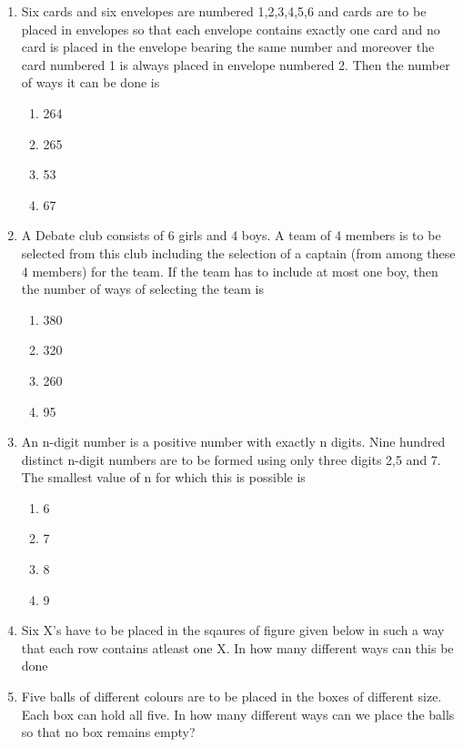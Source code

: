\begin{enumerate}[label=\arabic*.,ref=\thesubsection.\theenumi]
\begin{enumerate}
\end{enumerate}
\item Six cards and six envelopes are numbered 1,2,3,4,5,6 and cards are to be placed in envelopes so that each envelope contains exactly one card and no card is placed in the envelope bearing the same number and moreover the card numbered 1 is always placed in envelope numbered 2. Then the number of ways it can be done is 
\begin{enumerate}
\item 264
\item 265
\item 53
\item 67\\
\end{enumerate} 
\item A Debate club consists of 6 girls and 4 boys. A team of 4 members is to be selected from this club including the selection of a captain (from among these 4 members) for the team. If the team has to include  at most one boy, then the number of ways of selecting the team is 
\begin{enumerate}
\item 380
\item 320
\item 260
\item 95\\
\end{enumerate}
\item An n-digit number is a positive number with exactly n digits. Nine hundred distinct n-digit numbers are to be formed using only three digits 2,5 and 7. The smallest value of n for which this is possible is
\begin{enumerate}
\item 6
\item 7
\item 8
\item 9\\
\end{enumerate}
\item Six X's have to be placed in the sqaures of figure given below in such a way that each row contains atleast one X. In how many different ways can this be done
\item Five balls of different colours are to be placed in the boxes of different size. Each box can hold all five. In how many different ways can we place the balls so that no box remains empty?\\

\end{enumerate}
